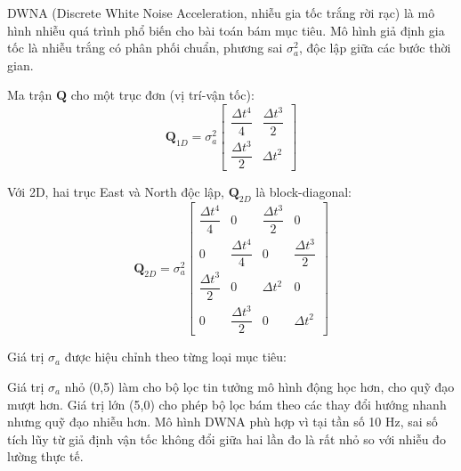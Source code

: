 \hspace{0.5cm} DWNA (Discrete White Noise Acceleration, nhiễu gia tốc trắng rời rạc) là mô hình nhiễu quá trình phổ biến cho bài toán bám mục tiêu. Mô hình giả định gia tốc là nhiễu trắng có phân phối chuẩn, phương sai $\sigma_a^2$, độc lập giữa các bước thời gian.

Ma trận $\mathbf{Q}$ cho một trục đơn (vị trí-vận tốc):
\begin{equation}
    \mathbf{Q}_{1D} = \sigma_a^2 \begin{bmatrix}
        \dfrac{\Delta t^4}{4} & \dfrac{\Delta t^3}{2} \\[6pt]
        \dfrac{\Delta t^3}{2} & \Delta t^2
    \end{bmatrix}
\end{equation}

Với 2D, hai trục East và North độc lập, $\mathbf{Q}_{2D}$ là block-diagonal:
\begin{equation}
    \mathbf{Q}_{2D} = \sigma_a^2 \begin{bmatrix}
        \dfrac{\Delta t^4}{4} & 0 & \dfrac{\Delta t^3}{2} & 0 \\[6pt]
        0 & \dfrac{\Delta t^4}{4} & 0 & \dfrac{\Delta t^3}{2} \\[6pt]
        \dfrac{\Delta t^3}{2} & 0 & \Delta t^2 & 0 \\[6pt]
        0 & \dfrac{\Delta t^3}{2} & 0 & \Delta t^2
    \end{bmatrix}
\end{equation}

Giá trị $\sigma_a$ được hiệu chỉnh theo từng loại mục tiêu:

\begin{table}[H]
\centering
\caption{Tham số $\sigma_a$ theo loại mục tiêu}
\label{tab:sigma-a}
\end{table}

Giá trị $\sigma_a$ nhỏ (0,5) làm cho bộ lọc tin tưởng mô hình động học hơn, cho quỹ đạo mượt hơn. Giá trị lớn (5,0) cho phép bộ lọc bám theo các thay đổi hướng nhanh nhưng quỹ đạo nhiễu hơn. Mô hình DWNA phù hợp vì tại tần số 10 Hz, sai số tích lũy từ giả định vận tốc không đổi giữa hai lần đo là rất nhỏ so với nhiễu đo lường thực tế.

